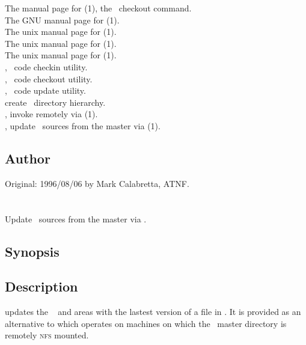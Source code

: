The manual page for (1), the \rcs\ checkout command.\\
The GNU manual page for (1).\\
The unix manual page for (1).\\
The unix manual page for (1).\\
The unix manual page for (1).\\
, \aipspp\ code checkin utility.\\
, \aipspp\ code checkout utility.\\
, \aipspp\ code update utility.\\
 create \aipspp\ directory hierarchy.\\
, invoke  remotely via (1).\\
, update \aipspp\ sources from the master via (1).

\subsection*{Author}
 
Original: 1996/08/06 by Mark Calabretta, ATNF.

 
\newpage
\section{}
\label{rau}
 
Update \aipspp\ sources from the master via .

\subsection*{Synopsis}
 
\begin{synopsis}
\end{synopsis}
 
\subsection*{Description}
 
 updates the \aipspp\  and  areas with the
lastest version of a file in .  It is provided as an
alternative to  which operates on machines on which the \aipspp\
master directory is remotely \textsc{nfs} mounted.

